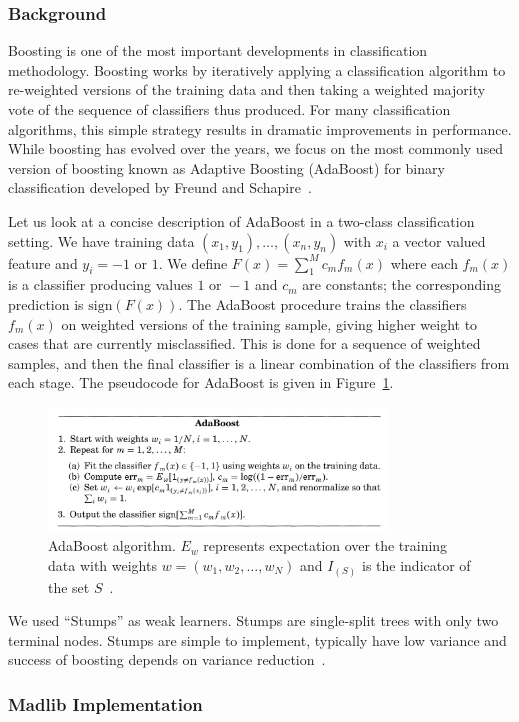 \subsubsection{Background}
Boosting is one of the most important developments in classification methodology. Boosting works by iteratively applying a classification algorithm to re-weighted versions of the training data and then taking a weighted majority vote of the sequence of classifiers thus produced. For many classification algorithms, this simple strategy results in dramatic improvements in performance. While boosting has evolved over the years, we focus on the most commonly used version of boosting known as Adaptive Boosting (AdaBoost) for binary classification developed by Freund and Schapire~\cite{boost96}.

Let us look at a concise description of AdaBoost in a two-class classification setting. We have training data $(x_1, y_1), \ldots, (x_n, y_n)$ with $x_i$ a vector valued feature and $y_i = -1\text{ or }1$. We define $F(x) = \sum_1^M{c_mf_m(x)}$ where each $f_m(x)$ is a classifier producing values $1\text{ or }-1$ and $c_m$ are constants; the corresponding prediction is $\text{sign}(F(x))$. The AdaBoost procedure trains the classifiers $f_m(x)$ on weighted versions of the training sample, giving higher weight to cases that are currently misclassified. This is done for a sequence of weighted samples, and then the final classifier is a linear combination of the classifiers from each stage. The pseudocode for AdaBoost is given in Figure~\ref{fig:adaproc}.

\begin{figure}[ht]
\centering
\includegraphics[width=0.8\textwidth]{ada.png}
\caption{AdaBoost algorithm. $E_w$ represents expectation over the training data with weights $w=(w_1,w_2,\ldots,w_N)$ and $I_{(S)}$ is the indicator of the set $S$~\cite{alr00}.}
\label{fig:adaproc}
\end{figure}

We used ``Stumps'' as weak learners. Stumps are single-split trees with only two terminal nodes. Stumps are simple to implement, typically have low variance and success of boosting depends on variance reduction~\cite{alr00}.


\subsubsection{Madlib Implementation}

